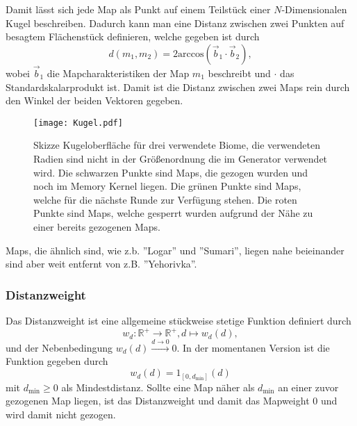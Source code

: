             Damit lässt sich jede Map als Punkt auf einem Teilstück einer $N$-Dimensionalen Kugel beschreiben. 
            Dadurch kann man eine Distanz zwischen zwei Punkten auf besagtem Flächenstück definieren, welche gegeben ist durch 
            \begin{equation}
                d(m_1, m_2) = 2\text{arccos}(\vec{b}_1\cdot\vec{b}_2),
            \end{equation}
            wobei $\vec{b}_1$ die Mapcharakteristiken der Map $m_1$ beschreibt und $\cdot$ das Standardskalarprodukt ist.
            Damit ist die Distanz zwischen zwei Maps rein durch den Winkel der beiden Vektoren gegeben. 
            \begin{figure}[htbp]
                \centering
                \texttt{[image: Kugel.pdf]}
                \caption{Skizze Kugeloberfläche für drei verwendete Biome, die verwendeten Radien sind nicht in der Größenordnung die im Generator verwendet wird. 
                            Die schwarzen Punkte sind Maps, die gezogen wurden und noch im Memory Kernel liegen. 
                            Die grünen Punkte sind Maps, welche für die nächste Runde zur Verfügung stehen.
                            Die roten Punkte sind Maps, welche gesperrt wurden aufgrund der Nähe zu einer bereits gezogenen Maps.}
            \end{figure}
            Maps, die ähnlich sind, wie z.b. ''Logar'' und ''Sumari'', liegen nahe beieinander sind aber weit entfernt von z.B. ''Yehorivka''.
        \subsubsection{Distanzweight}
            Das Distanzweight ist eine allgemeine stückweise stetige Funktion definiert durch
            \begin{equation}
                w_d : \mathbb{R}^+ \rightarrow \mathbb{R}^+, d \mapsto w_d(d),
            \end{equation}
            und der Nebenbedingung $w_d(d)\overset{d\rightarrow 0}{\longrightarrow}0$.
            In der momentanen Version ist die Funktion gegeben durch
            \begin{equation}
                w_d(d) = 1_{[0,d_\text{min}]}(d)
            \end{equation}
            mit $d_\text{min}\geq 0$ als Mindestdistanz. 
            Sollte eine Map näher als $d_\text{min}$ an einer zuvor gezogenen Map liegen, ist das Distanzweight und damit das Mapweight $0$ und wird damit nicht gezogen.        
